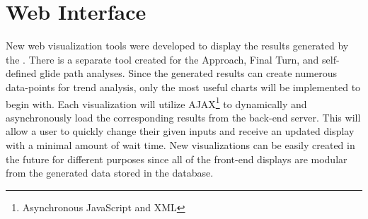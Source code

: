 \section{Web Interface}
    
    New web visualization tools were developed to display the results generated by the \toolname.  There is a separate tool created for the Approach, Final Turn, and self-defined glide path analyses.  Since the generated results can create numerous data-points for trend analysis, only the most useful charts will be implemented to begin with.  Each visualization will utilize AJAX\footnote{Asynchronous JavaScript and XML} to dynamically and asynchronously load the corresponding results from the back-end server.  This will allow a user to quickly change their given inputs and receive an updated display with a minimal amount of wait time.  New visualizations can be easily created in the future for different purposes since all of the front-end displays are modular from the generated data stored in the database.


